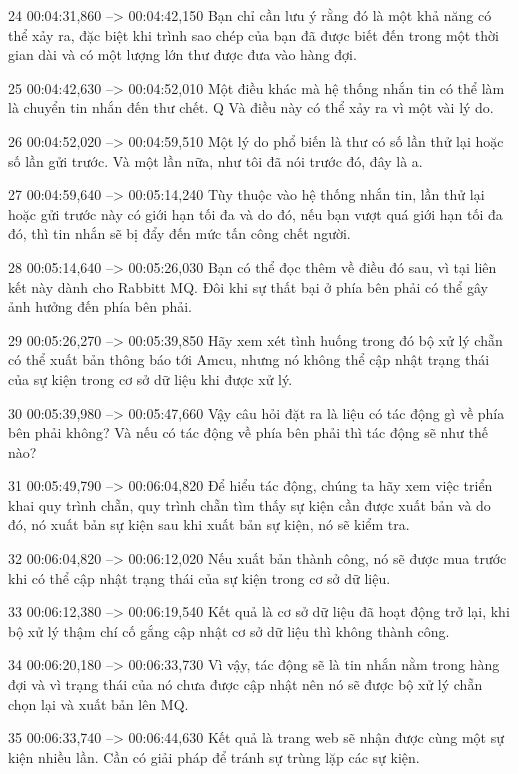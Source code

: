 24
00:04:31,860 --> 00:04:42,150
Bạn chỉ cần lưu ý rằng đó là một khả năng có thể xảy ra, đặc biệt khi trình sao chép của bạn đã được biết đến trong một thời gian dài và có một lượng lớn thư được đưa vào hàng đợi.

25
00:04:42,630 --> 00:04:52,010
Một điều khác mà hệ thống nhắn tin có thể làm là chuyển tin nhắn đến thư chết.  Q Và điều này có thể xảy ra vì một vài lý do.

26
00:04:52,020 --> 00:04:59,510
Một lý do phổ biến là thư có số lần thử lại hoặc số lần gửi trước.  Và một lần nữa, như tôi đã nói trước đó, đây là a.

27
00:04:59,640 --> 00:05:14,240
Tùy thuộc vào hệ thống nhắn tin, lần thử lại hoặc gửi trước này có giới hạn tối đa và do đó, nếu bạn vượt quá giới hạn tối đa đó, thì tin nhắn sẽ bị đẩy đến mức tấn công chết người.

28
00:05:14,640 --> 00:05:26,030
Bạn có thể đọc thêm về điều đó sau, vì tại liên kết này dành cho Rabbitt MQ.  Đôi khi sự thất bại ở phía bên phải có thể gây ảnh hưởng đến phía bên phải.

29
00:05:26,270 --> 00:05:39,850
Hãy xem xét tình huống trong đó bộ xử lý chẵn có thể xuất bản thông báo tới Amcu, nhưng nó không thể cập nhật trạng thái của sự kiện trong cơ sở dữ liệu khi được xử lý.

30
00:05:39,980 --> 00:05:47,660
Vậy câu hỏi đặt ra là liệu có tác động gì về phía bên phải không?  Và nếu có tác động về phía bên phải thì tác động sẽ như thế nào?

31
00:05:49,790 --> 00:06:04,820
Để hiểu tác động, chúng ta hãy xem việc triển khai quy trình chẵn, quy trình chẵn tìm thấy sự kiện cần được xuất bản và do đó, nó xuất bản sự kiện sau khi xuất bản sự kiện, nó sẽ kiểm tra.

32
00:06:04,820 --> 00:06:12,020
Nếu xuất bản thành công, nó sẽ được mua trước khi có thể cập nhật trạng thái của sự kiện trong cơ sở dữ liệu.

33
00:06:12,380 --> 00:06:19,540
Kết quả là cơ sở dữ liệu đã hoạt động trở lại, khi bộ xử lý thậm chí cố gắng cập nhật cơ sở dữ liệu thì không thành công.

34
00:06:20,180 --> 00:06:33,730
Vì vậy, tác động sẽ là tin nhắn nằm trong hàng đợi và vì trạng thái của nó chưa được cập nhật nên nó sẽ được bộ xử lý chẵn chọn lại và xuất bản lên MQ.

35
00:06:33,740 --> 00:06:44,630
Kết quả là trang web sẽ nhận được cùng một sự kiện nhiều lần.  Cần có giải pháp để tránh sự trùng lặp các sự kiện.

